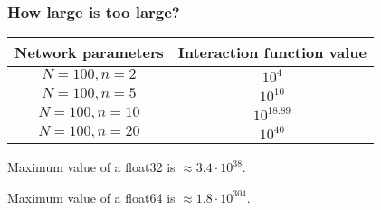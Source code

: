 \begin{frame}
    \frametitle{How large is too large?}

    \begin{center}
        \begin{tabular}{| c | c |}
            \hline
            Network parameters & Interaction function value \\
            \hline
            \hline
            \(N=100, n=2\) & \(10^{4}\) \\
            \hline
            \(N=100, n=5\) & \(10^{10}\) \\
            \hline
            \(N=100, n=10\) & \(10^{18.89}\) \\
            \hline
            \(N=100, n=20\) & \(10^{40}\) \\
            \hline
        \end{tabular}
    \end{center}

    \begin{center}
        \pause
        Maximum value of a float32 is \(\approx 3.4 \cdot 10^{38}\).
        
        \pause
        Maximum value of a float64 is \(\approx 1.8 \cdot 10^{304}\).
    \end{center}
\end{frame}

    
    

